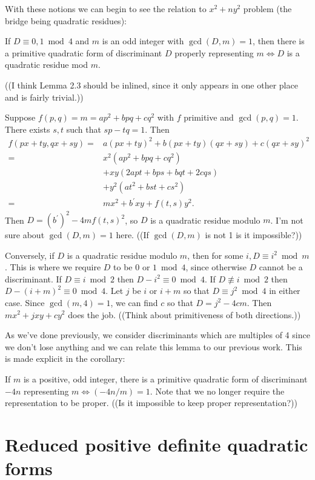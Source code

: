 With these notions we can begin to see the relation to $x^2+ny^2$ problem (the bridge being quadratic residues):

If $D\equiv 0,1\bmod 4$ and $m$ is an odd integer with $\gcd(D, m)=1$, then there is a primitive quadratic form of discriminant $D$ properly representing $m\iff D$ is a quadratic residue mod $m$.

((I think Lemma 2.3 should be inlined, since it only appears in one other place and is fairly trivial.))

Suppose $f(p,q)=m=ap^2+bpq+cq^2$ with $f$ primitive and $\gcd(p,q)=1$. There exists $s,t$ such that $sp-tq=1$. Then
\begin{align*}
f(px+ty, qx+sy)=&a(px+ty)^2+b(px+ty)(qx+sy)+c(qx+sy)^2\\
 =& x^2(ap^2+bpq+cq^2)\\
 &+ xy(2apt+bps+bqt+2cqs)\\
 &+ y^2(at^2+bst+cs^2)\\
 =& mx^2 + b^\prime xy + f(t,s)y^2.
\end{align*}
Then $D=(b^\prime)^2 - 4mf(t,s)^2$, so $D$ is a quadratic residue modulo $m$. I'm not sure about $\gcd(D,m)=1$ here. ((If $\gcd(D,m)$ is not 1 is it impossible?))

Conversely, if $D$ is a quadratic residue modulo $m$, then for some $i, D\equiv i^2\bmod m$. This is where we require $D$ to be 0 or $1\bmod 4$, since otherwise $D$ cannot be a discriminant. If $D\equiv i\bmod 2$ then $D-i^2\equiv 0\bmod 4$. If $D \not\equiv i\bmod 2$ then $D-(i+m)^2\equiv 0\bmod 4$. Let $j$ be $i$ or $i+m$ so that $D\equiv j^2\bmod 4$ in either case. Since $\gcd(m,4)=1$, we can find $c$ so that $D=j^2-4cm$. Then $mx^2+jxy+cy^2$ does the job. ((Think about primitiveness of both directions.))

As we've done previously, we consider discriminants which are multiples of 4 since we don't lose anything and we can relate this lemma to our previous work. This is made explicit in the corollary:

If $m$ is a positive, odd integer, there is a primitive quadratic form of discriminant $-4n$ representing $m \iff (-4n/m)=1$. Note that we no longer require the representation to be proper. ((Is it impossible to keep proper representation?))

\section{Reduced positive definite quadratic forms}

